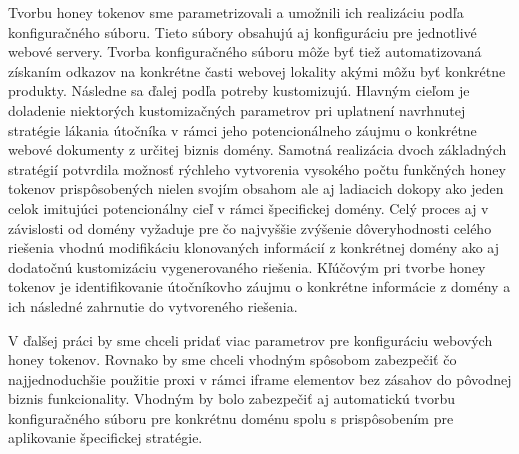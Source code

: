 \documentclass[conference, 11pt,slovak,a4paper,twoside]{IEEEtran}
\begin{document}
Tvorbu honey tokenov sme parametrizovali a umožnili ich realizáciu podľa konfiguračného súboru. Tieto súbory obsahujú aj konfiguráciu pre jednotlivé webové servery. Tvorba konfiguračného súboru môže byť tiež automatizovaná získaním odkazov na konkrétne časti webovej lokality akými môžu byť konkrétne produkty. Následne sa ďalej podľa potreby kustomizujú. Hlavným cieľom je doladenie niektorých kustomizačných parametrov pri uplatnení navrhnutej stratégie lákania útočníka v rámci jeho potencionálneho záujmu o konkrétne webové dokumenty z určitej biznis domény. Samotná realizácia dvoch základných stratégií potvrdila možnosť rýchleho vytvorenia vysokého počtu funkčných honey tokenov prispôsobených nielen svojím obsahom ale aj ladiacich dokopy ako jeden celok imitujúci potencionálny cieľ v rámci špecifickej domény. Celý proces aj v závislosti od domény vyžaduje pre čo najvyššie zvýšenie dôveryhodnosti celého riešenia vhodnú modifikáciu klonovaných informácií z konkrétnej domény ako aj dodatočnú kustomizáciu vygenerovaného riešenia. Kľúčovým pri tvorbe honey tokenov je identifikovanie útočníkovho záujmu o konkrétne informácie z domény a ich následné zahrnutie do vytvoreného riešenia.

V ďalšej práci by sme chceli pridať viac parametrov pre konfiguráciu webových honey tokenov. Rovnako by sme chceli vhodným spôsobom zabezpečiť čo najjednoduchšie použitie proxi v rámci iframe elementov bez zásahov do pôvodnej biznis funkcionality. Vhodným by bolo zabezpečiť aj automatickú tvorbu konfiguračného súboru pre konkrétnu doménu spolu s prispôsobením pre aplikovanie špecifickej stratégie.


\end{document}
